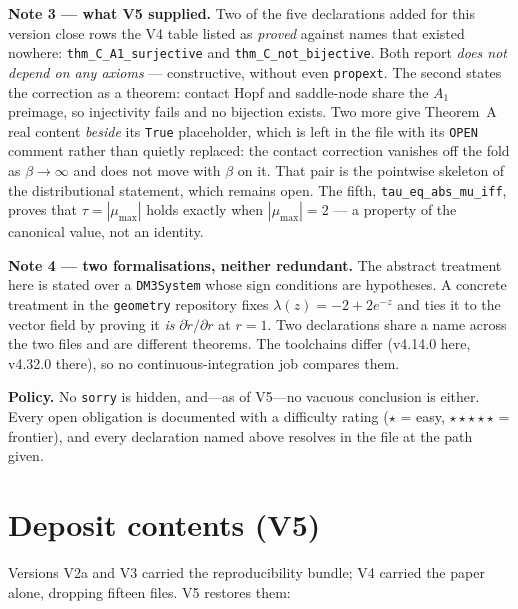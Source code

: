 \documentclass[11pt]{article}
\theoremstyle{boxed}
\begin{document}
\smallskip
\noindent\textbf{Note 3 --- what V5 supplied.} Two of the five declarations added for this version
close rows the V4 table listed as \emph{proved} against names that existed nowhere:
\texttt{thm\_C\_A1\_surjective} and \texttt{thm\_C\_not\_bijective}. Both report \emph{does not
depend on any axioms} --- constructive, without even \texttt{propext}. The second states the
correction as a theorem: contact Hopf and saddle-node share the $A_1$ preimage, so injectivity fails
and no bijection exists. Two more give Theorem~A real content \emph{beside} its \texttt{True}
placeholder, which is left in the file with its \texttt{OPEN} comment rather than quietly replaced:
the contact correction vanishes off the fold as $\beta \to \infty$ and does not move with $\beta$ on
it. That pair is the pointwise skeleton of the distributional statement, which remains open. The
fifth, \texttt{tau\_eq\_abs\_mu\_iff}, proves that $\tau = |\mu_{\max}|$ holds exactly when
$|\mu_{\max}| = 2$ --- a property of the canonical value, not an identity.

\smallskip
\noindent\textbf{Note 4 --- two formalisations, neither redundant.} The abstract treatment here is
stated over a \texttt{DM3System} whose sign conditions are hypotheses. A concrete treatment in the
\texttt{geometry} repository fixes $\lambda(z) = -2 + 2e^{-z}$ and ties it to the vector field by
proving it \emph{is} $\partial\dot r/\partial r$ at $r=1$. Two declarations share a name across the
two files and are different theorems. The toolchains differ (v4.14.0 here, v4.32.0 there), so no
continuous-integration job compares them.

\smallskip
\noindent\textbf{Policy.} No \texttt{sorry} is hidden, and---as of V5---no vacuous conclusion is
either. Every open obligation is documented with a difficulty rating ($\star$ = easy,
$\star\star\star\star\star$ = frontier), and every declaration named above resolves in the file at
the path given.

\section*{Deposit contents (V5)}

Versions V2a and V3 carried the reproducibility bundle; V4 carried the paper alone, dropping fifteen
files. V5 restores them:
\end{document}
